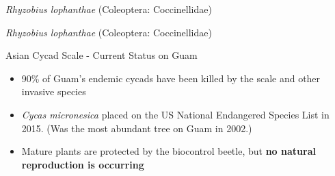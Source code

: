 \documentclass[]{beamer}
\begin{document}
\begin{frame}{\textit{Rhyzobius lophanthae} (Coleoptera: Coccinellidae)}
\end{frame}

\begin{frame}{\textit{Rhyzobius lophanthae} (Coleoptera: Coccinellidae)}
\end{frame}

\begin{frame}{51}
\end{frame}


\begin{frame}{Asian Cycad Scale - Current Status on Guam}
	\begin{itemize}
		\item 90\% of Guam's endemic cycads have been killed by the scale and other invasive species
		
		\item \textit{Cycas micronesica} placed on the US National Endangered Species List in 2015. (Was the most abundant tree on Guam in 2002.)
				
		\item Mature plants are protected by the biocontrol beetle, but \textbf{no natural reproduction is occurring}
	\end{itemize}
\end{frame}


\end{document}
